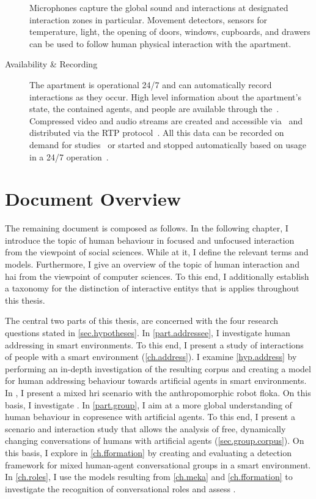 \begin{description}
Microphones capture the global sound and interactions at designated interaction zones in particular.
Movement detectors, sensors for temperature, light, the opening of doors, windows, cupboards, and drawers can be used to follow human physical interaction with the \gls{apartment}.
\item[Availability \& Recording] The \gls{apartment} is operational 24/7 and can automatically record interactions as they occur.
High level information about the \gls{apartment}'s state, the contained agents, and people are available through the~.
Compressed video and audio streams are created and accessible via~ and distributed via the RTP protocol~\cite{RFC3550}.
All this data can be recorded on demand for studies~\cite{Holthaus2016a} or started and stopped automatically based on usage in a 24/7 operation~\cite{Richter2018}.
\end{description}

\section{Document Overview}

The remaining document is composed as follows.
In the following chapter, I introduce the topic of human  behaviour in focused and \gls{unfocused interaction} from the viewpoint of social sciences.
While at it, I define the relevant terms and models.
Furthermore, I give an overview of the topic of human interaction and \gls{hai} from the viewpoint of computer sciences.
To this end, I additionally establish a taxonomy for the distinction of \glspl{interactive entity} that is applies throughout this thesis.

The central two parts of this thesis, are concerned with the four research questions stated in \cref{sec.hypotheses}.
In \cref{part.addressee}, I investigate human addressing in \glspl{smart environment}.
To this end, I present a study of \naive{} interactions of people with a \gls{smart environment} (\cref{ch.address}).
I examine \cref{hyp.address} by performing an in-depth investigation of the resulting corpus and creating a model for human addressing behaviour towards \glspl{artificial agent} in \glspl{smart environment}.
In , I present a mixed \gls{hri} scenario with the anthropomorphic \gls{robot} \gls{floka}.
On this basis, I investigate .
In \cref{part.group}, I aim at a more global understanding of human behaviour in \gls{copresence} with \glspl{artificial agent}.
To this end, I present a scenario and interaction study that allows the analysis of free, dynamically changing \glspl{conversation} of humans with \glspl{artificial agent} (\cref{sec.group.corpus}).
On this basis, I explore  in \cref{ch.fformation} by creating and evaluating a detection framework for mixed human-agent \glspl{conversational group} in a \gls{smart environment}.
In \cref{ch.roles}, I use the models resulting from \cref{ch.meka} and \cref{ch.fformation} to investigate the recognition of \glspl{conversational role} and assess .

